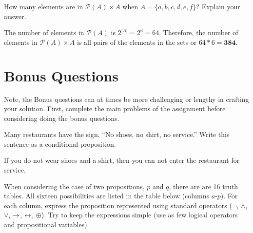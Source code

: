 \begin{questions}
 How many elements are in $\mathcal{P}(A) \times A$ when $A = \{a,
b, c, d, e, f\}$?  Explain your answer.
   \ifprintanswers
        \vspace{-5pt}
    \fi
	\begin{solution}
	    The number of elements in $\mathcal{P}(A)$ is $2^{|A|} = 2^6 = 64$. 
	Therefore, the number of elements in  $\mathcal{P}(A) \times A$ is all pairs of
	the elements in the sets or $64 * 6 = \mathbf{384}$.
	\end{solution}



\section*{Bonus Questions}

Note, the Bonus questions can at times be more challenging or lengthy in crafting your solution.  First, complete the main problems of the assignment before considering doing the bonus questions.


\bonusquestion[1] Many restaurants have the sign, ``No shoes, no shirt, no service.''  Write this sentence as a conditional proposition. 

\begin{solution}
    If you do not wear shoes and a shirt, then you can not enter the restaurant for service.
\end{solution}


\bonusquestion[2] When considering the case of two propositions, $p$ and $q$, there are are 16 truth tables.  All sixteen possibilities are listed in the table below (columns $a$-$p$).  For each column, express the proposition represented using standard operators ($\neg$, $\wedge$, $\vee$, $\rightarrow$, $\leftrightarrow$, $\oplus$).  Try to keep the expressions simple (use as few logical operators and propositional variables). 



\end{questions}

